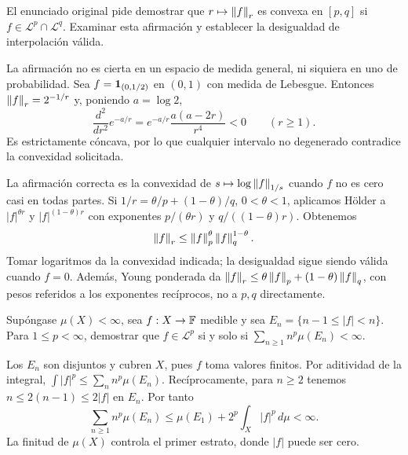 \begin{ejercicio}\label{ej:v2-l18-7}
El enunciado original pide demostrar que $r\mapsto\left\lVert f\right\rVert_r$ es convexa en $[p,q]$ si $f\in\mathcal L^p\cap\mathcal L^q$. Examinar esta afirmación y establecer la desigualdad de interpolación válida.
\end{ejercicio}
\begin{solucion}
La afirmación no es cierta en un espacio de medida general, ni siquiera en uno de probabilidad. Sea $f=\mathbf1_{(0,1/2)}$ en $(0,1)$ con medida de Lebesgue. Entonces $\left\lVert f\right\rVert_r=2^{-1/r}$ y, poniendo $a=\log2$,
\[
 \frac{d^2}{dr^2}e^{-a/r}=e^{-a/r}\frac{a(a-2r)}{r^4}<0\qquad(r\ge1).
\]
Es estrictamente cóncava, por lo que cualquier intervalo no degenerado contradice la convexidad solicitada.

La afirmación correcta es la convexidad de $s\mapsto\log\left\lVert f\right\rVert_{1/s}$ cuando $f$ no es cero casi en todas partes. Si $1/r=\theta/p+(1-\theta)/q$, $0<\theta<1$, aplicamos Hölder a $|f|^{\theta r}$ y $|f|^{(1-\theta)r}$ con exponentes $p/(\theta r)$ y $q/((1-\theta)r)$. Obtenemos
\[
 \left\lVert f\right\rVert_r\le\left\lVert f\right\rVert_p^{\theta}\left\lVert f\right\rVert_q^{1-\theta}.
\]
Tomar logaritmos da la convexidad indicada; la desigualdad sigue siendo válida cuando $f=0$. Además, Young ponderada da $\left\lVert f\right\rVert_r\le\theta\left\lVert f\right\rVert_p+(1-\theta)\left\lVert f\right\rVert_q$, con pesos referidos a los exponentes recíprocos, no a $p,q$ directamente.
\end{solucion}

\begin{ejercicio}\label{ej:v2-l18-8}
Supóngase $\mu(X)<\infty$, sea $f:X\to\mathbb F$ medible y sea $E_n=\{n-1\le|f|<n\}$. Para $1\le p<\infty$, demostrar que $f\in\mathcal L^p$ si y solo si $\sum_{n\ge1}n^p\mu(E_n)<\infty$.
\end{ejercicio}
\begin{solucion}
Los $E_n$ son disjuntos y cubren $X$, pues $f$ toma valores finitos. Por aditividad de la integral,
$\int|f|^p\le\sum_n n^p\mu(E_n)$. Recíprocamente, para $n\ge2$ tenemos $n\le2(n-1)\le2|f|$ en $E_n$. Por tanto
\[
 \sum_{n\ge1}n^p\mu(E_n)\le\mu(E_1)+2^p\int_X|f|^p\,d\mu<\infty.
\]
La finitud de $\mu(X)$ controla el primer estrato, donde $|f|$ puede ser cero.
\end{solucion}

